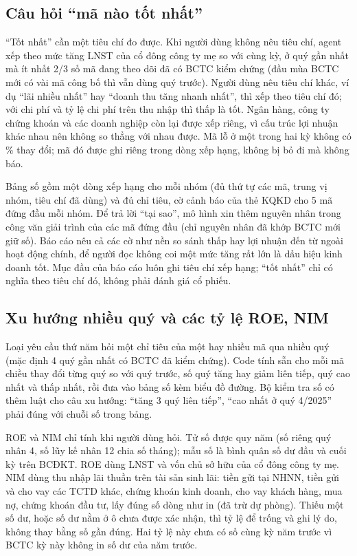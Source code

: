 \documentclass[12pt,a4paper]{report}
\newcommand{\enquote}[1]{“#1”}
\begin{document}
\subsection{Câu hỏi \enquote{mã nào tốt nhất}}
\enquote{Tốt nhất} cần một tiêu chí đo được. Khi người dùng không nêu tiêu chí, agent xếp theo mức tăng LNST của cổ
đông công ty mẹ so với cùng kỳ, ở quý gần nhất mà ít nhất 2/3 số mã đang theo dõi đã có BCTC kiểm chứng (đầu mùa BCTC
mới có vài mã công bố thì vẫn dùng quý trước). Người dùng nêu tiêu chí khác, ví dụ \enquote{lãi nhiều nhất} hay
\enquote{doanh thu tăng nhanh nhất}, thì xếp theo tiêu chí đó; với chi phí và tỷ lệ chi phí trên thu nhập thì thấp là
tốt. Ngân hàng, công ty chứng khoán và các doanh nghiệp còn lại được xếp riêng, vì cấu trúc lợi nhuận khác nhau nên không
so thẳng với nhau được. Mã lỗ ở một trong hai kỳ không có \% thay đổi; mã đó được ghi riêng trong dòng xếp hạng, không bị
bỏ đi mà không báo.

Bảng số gồm một dòng xếp hạng cho mỗi nhóm (đủ thứ tự các mã, trung vị nhóm, tiêu chí đã dùng) và đủ chỉ tiêu, cờ cảnh báo
của thẻ KQKD cho 5 mã đứng đầu mỗi nhóm. Để trả lời \enquote{tại sao}, mô hình xin thêm nguyên nhân trong công văn giải
trình của các mã đứng đầu (chỉ nguyên nhân đã khớp BCTC mới giữ số). Báo cáo nêu cả các cờ như nền so sánh thấp hay lợi
nhuận đến từ ngoài hoạt động chính, để người đọc không coi một mức tăng rất lớn là dấu hiệu kinh doanh tốt. Mục đầu của
báo cáo luôn ghi tiêu chí xếp hạng; \enquote{tốt nhất} chỉ có nghĩa theo tiêu chí đó, không phải đánh giá cổ phiếu.

\subsection{Xu hướng nhiều quý và các tỷ lệ ROE, NIM}\label{sec:xuhuong}
Loại yêu cầu thứ năm hỏi một chỉ tiêu của một hay nhiều mã qua nhiều quý (mặc định 4 quý gần nhất có BCTC đã kiểm
chứng). Code tính sẵn cho mỗi mã chiều thay đổi từng quý so với quý trước, số quý tăng hay giảm liên tiếp, quý cao nhất
và thấp nhất, rồi đưa vào bảng số kèm biểu đồ đường. Bộ kiểm tra số có thêm luật cho câu xu hướng: \enquote{tăng 3 quý
liên tiếp}, \enquote{cao nhất ở quý 4/2025} phải đúng với chuỗi số trong bảng.

ROE và NIM chỉ tính khi người dùng hỏi. Tử số được quy năm (số riêng quý nhân 4, số lũy kế nhân 12 chia số tháng); mẫu số
là bình quân số dư đầu và cuối kỳ trên BCĐKT. ROE dùng LNST và vốn chủ sở hữu của cổ đông công ty mẹ. NIM dùng thu nhập
lãi thuần trên tài sản sinh lãi: tiền gửi tại NHNN, tiền gửi và cho vay các TCTD khác, chứng khoán kinh doanh, cho vay
khách hàng, mua nợ, chứng khoán đầu tư, lấy đúng số dòng như in (đã trừ dự phòng). Thiếu một số dư, hoặc số dư nằm ở ô
chưa được xác nhận, thì tỷ lệ để trống và ghi lý do, không thay bằng số gần đúng. Hai tỷ lệ này chưa có số cùng kỳ năm
trước vì BCTC kỳ này không in số dư của năm trước.
\end{document}
